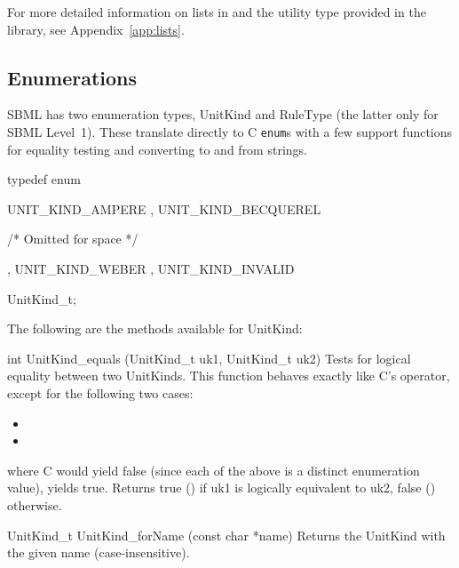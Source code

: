 \documentclass{sbmlmanual}
\begin{document}
For more detailed information on lists in \libsbml{} and the
 utility type provided in the library, see
Appendix~\ref{app:lists}.


\subsection{Enumerations}
\label{sec:enumerations}

SBML has two enumeration types, UnitKind and RuleType (the latter only for
SBML Level~1).  These translate directly to C \texttt{enum}s with a few
support functions for equality testing and converting to and from strings.


\begin{example}[c]
  typedef enum
  {
      UNIT_KIND_AMPERE
    , UNIT_KIND_BECQUEREL
  
     /* Omitted for space */
  
    , UNIT_KIND_WEBER
    , UNIT_KIND_INVALID
  } UnitKind_t;
  \end{example}

The following are the methods available for UnitKind:

\begin{methoddef}{int UnitKind\_equals (UnitKind\_t uk1, UnitKind\_t uk2)}
  Tests for logical equality between two UnitKinds.  This function behaves
  exactly like C's \code{==} operator, except for the following two cases:

\begin{itemize}
  \item {}
  \item {}
\end{itemize}

  where C would yield false (since each of the above is a distinct
  enumeration value),  yields true.
  Returns true () if uk1 is logically equivalent to uk2, false
  () otherwise.
\end{methoddef}
  
\begin{methoddef}{UnitKind\_t UnitKind\_forName (const char *name)}
  Returns the UnitKind with the given name (case-insensitive).
\end{methoddef}
\end{document}
